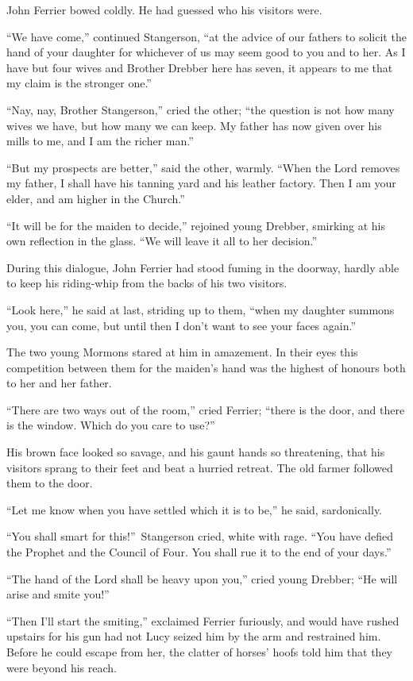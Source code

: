 \documentclass[12pt,english,oneside]{book}
\begin{document}
John Ferrier bowed coldly. He had guessed who his visitors were.

{}``We have come,'' continued Stangerson, {}``at the advice of
our fathers to solicit the hand of your daughter for whichever of
us may seem good to you and to her. As I have but four wives and Brother
Drebber here has seven, it appears to me that my claim is the stronger
one.''

{}``Nay, nay, Brother Stangerson,'' cried the other; {}``the question
is not how many wives we have, but how many we can keep. My father
has now given over his mills to me, and I am the richer man.''

{}``But my prospects are better,'' said the other, warmly. {}``When
the Lord removes my father, I shall have his tanning yard and his
leather factory. Then I am your elder, and am higher in the Church.''

{}``It will be for the maiden to decide,'' rejoined young Drebber,
smirking at his own reflection in the glass. {}``We will leave it
all to her decision.''

During this dialogue, John Ferrier had stood fuming in the doorway,
hardly able to keep his riding-whip from the backs of his two visitors.

{}``Look here,'' he said at last, striding up to them, {}``when
my daughter summons you, you can come, but until then I don't want
to see your faces again.''

The two young Mormons stared at him in amazement. In their eyes this
competition between them for the maiden's hand was the highest of
honours both to her and her father.

{}``There are two ways out of the room,'' cried Ferrier; {}``there
is the door, and there is the window. Which do you care to use?''

His brown face looked so savage, and his gaunt hands so threatening,
that his visitors sprang to their feet and beat a hurried retreat.
The old farmer followed them to the door.

{}``Let me know when you have settled which it is to be,'' he said,
sardonically.

{}``You shall smart for this!''\ Stangerson cried, white with rage.
{}``You have defied the Prophet and the Council of Four. You shall
rue it to the end of your days.''

{}``The hand of the Lord shall be heavy upon you,'' cried young
Drebber; {}``He will arise and smite you!''

{}``Then I'll start the smiting,'' exclaimed Ferrier furiously,
and would have rushed upstairs for his gun had not Lucy seized him
by the arm and restrained him. Before he could escape from her, the
clatter of horses' hoofs told him that they were beyond his reach.
\end{document}

